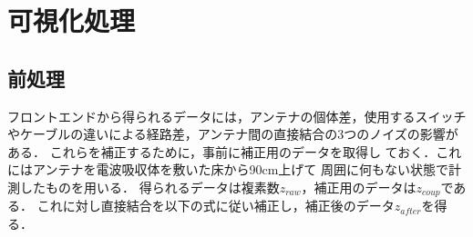 ﻿\documentclass[12pt,oneside]{jsbook}
\begin{document}
\section{可視化処理}
\label{021920_15Feb15}
\subsection{前処理}
フロントエンドから得られるデータには，アンテナの個体差，使用するスイッチ
やケーブルの違いによる経路差，アンテナ間の直接結合の3つのノイズの影響がある．
これらを補正するために，事前に補正用のデータを取得し
ておく．これにはアンテナを電波吸収体を敷いた床から90cm上げて
周囲に何もない状態で計測したものを用いる．
得られるデータは複素数$z_{raw}$，補正用のデータは$z_{coup}$である．
これに対し直接結合を以下の式に従い補正し，補正後のデータ$z_{after}$を得る．
\end{document}
